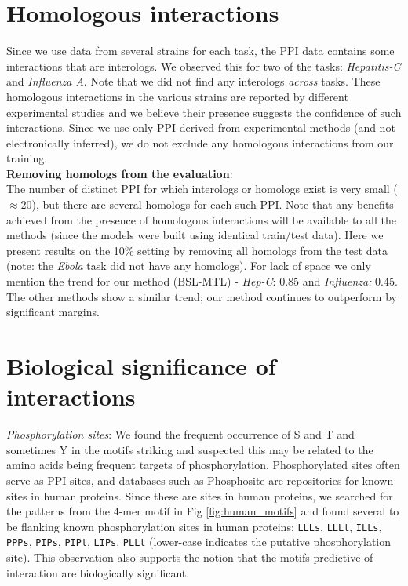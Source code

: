 \documentclass[a4paper,11pt]{article}
\begin{document}

\section{Homologous interactions}
Since we use data from several strains for each task, the PPI data contains some interactions that are interologs.
We observed this for two of the tasks: \textit{Hepatitis-C} and \textit{Influenza A}. Note that we did not find any interologs \textit{across} tasks. These homologous interactions in the various strains are reported by different experimental studies and we believe their presence suggests the confidence of such interactions. Since we use only PPI derived from experimental methods (and not electronically inferred), we do not exclude any homologous interactions from our training. \\
\textbf{Removing homologs from the evaluation}:\\
\noindent The number of distinct PPI for which interologs or homologs exist is very small ($\approx$20), but there are several homologs for each such PPI. Note that any benefits achieved from the presence of homologous interactions will be available to all the methods (since the models were built using identical train/test data). Here we present results on the 10\% setting by removing all homologs from the test data (note: the \textit{Ebola} task did not have any homologs). For lack of space we only mention the trend for our method (BSL-MTL) - \textit{Hep-C}: 0.85 and \textit{Influenza:} 0.45. The other methods show a similar trend; our method continues to outperform by significant margins.


\section{Biological significance of interactions} 
 \noindent\emph{Phosphorylation sites}: 
 We found the frequent occurrence of S and T and sometimes Y in the motifs striking and suspected this may be
 related to the amino acids being frequent targets of phosphorylation.
 Phosphorylated sites often serve as PPI sites, and databases such as Phosphosite \cite{phosphosite} are
  repositories for known sites in human proteins. Since these are sites in human proteins, we searched for the patterns
	from the 4-mer motif in Fig \ref{fig:human_motifs} and found several to be flanking known phosphorylation sites in human proteins:
	\texttt{LLLs}, \texttt{LLLt}, \texttt{ILLs}, \texttt{PPPs}, \texttt{PIPs}, \texttt{PIPt}, \texttt{LIPs}, \texttt{PLLt} (lower-case indicates the putative phosphorylation site). This observation also supports the notion that the motifs predictive
	of interaction are biologically significant.
\end{document}

